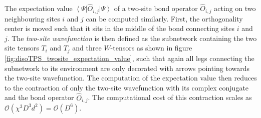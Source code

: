 The expectation value $\left\langle\Psi\right|\hat{O}_{i,j}\left|\Psi\right\rangle$ of a two-site bond operator $\hat{O}_{i,j}$ acting on two neighbouring sites $i$ and $j$ can be computed similarly. First, the orthogonality center is moved such that it sits in the middle of the bond connecting sites $i$ and $j$. The \textit{two-site wavefunction} is then defined as the subnetwork containing the two site tensors $T_i$ and $T_j$ and three $W$-tensors as shown in figure \ref{fig:disoTPS_twosite_expectation_value}, such that again all legs connecting the subnetwork to its environment are only decorated with arrows pointing towards the two-site wavefunction. The computation of the expectation value then reduces to the contraction of only the two-site wavefunction with its complex conjugate and the bond operator $\hat{O}_{i,j}$. The computational cost of this contraction scales as $\mathcal{O}\left(\chi^3D^3d^2\right) = \mathcal{O}(D^6)$.